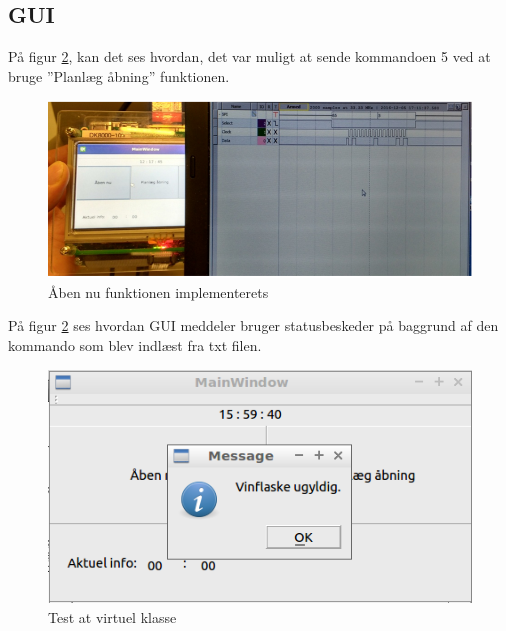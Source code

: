 \subsection{GUI}

På figur \ref{PAA}, kan det ses hvordan, det var muligt at sende kommandoen 5 ved at bruge ”Planlæg åbning” funktionen. 

\begin{figure}[H]
	\includegraphics[scale=1]{tex/Test/GUI-Test/Billeder/test_GUI}
	\caption{Åben nu funktionen implementerets}
	\label{PAA}
\end{figure}

På figur \ref{PAA} ses hvordan GUI meddeler 
bruger statusbeskeder på baggrund af den kommando som blev indlæst fra txt filen.

\begin{figure}[H]
	\includegraphics[scale=1]{tex/Test/GUI-Test/Billeder/Test_Virtuel_klasse_invalid}
	\caption{Test at virtuel klasse}
	\label{PAA}
\end{figure}